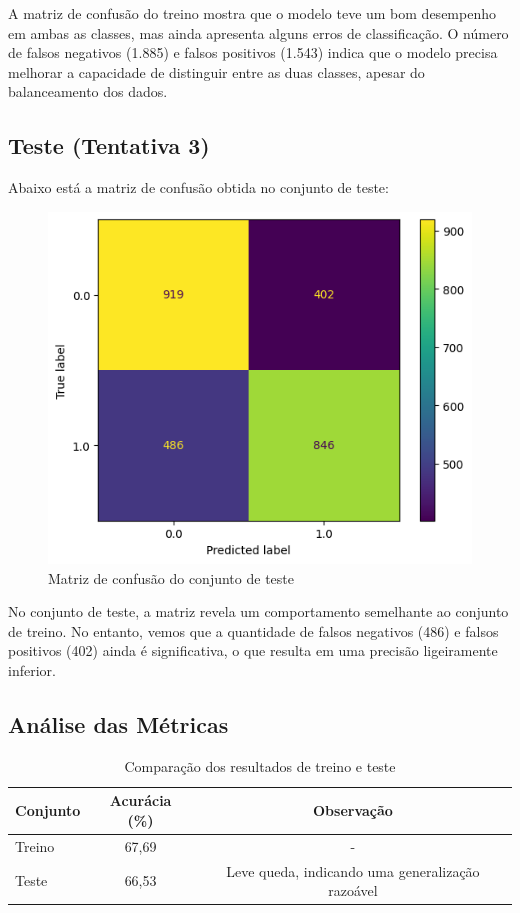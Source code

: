 \documentclass{abntpuc}
\begin{document}
A matriz de confusão do treino mostra que o modelo teve um bom desempenho em ambas as classes, mas ainda apresenta alguns erros de classificação. O número de falsos negativos (1.885) e falsos positivos (1.543) indica que o modelo precisa melhorar a capacidade de distinguir entre as duas classes, apesar do balanceamento dos dados.

\subsection*{\centering\large\textbf{Teste (Tentativa 3)}}
Abaixo está a matriz de confusão obtida no conjunto de teste:

\begin{figure}[H]
    \centering
    \includegraphics[width=\textwidth]{grafico10.png}
    \caption{Matriz de confusão do conjunto de teste}
\end{figure}

No conjunto de teste, a matriz revela um comportamento semelhante ao conjunto de treino. No entanto, vemos que a quantidade de falsos negativos (486) e falsos positivos (402) ainda é significativa, o que resulta em uma precisão ligeiramente inferior.

\subsection*{\centering\large\textbf{Análise das Métricas}}

\begin{table}[H]
\centering
\begin{tabular}{lcc}
\toprule
Conjunto & Acurácia (\%) & Observação \\
\midrule
Treino & 67,69 & - \\
Teste & 66,53 & Leve queda, indicando uma generalização razoável \\
\bottomrule
\end{tabular}
\caption{Comparação dos resultados de treino e teste}
\label{tab:comparacao_resultados}
\end{table}
\end{document}
